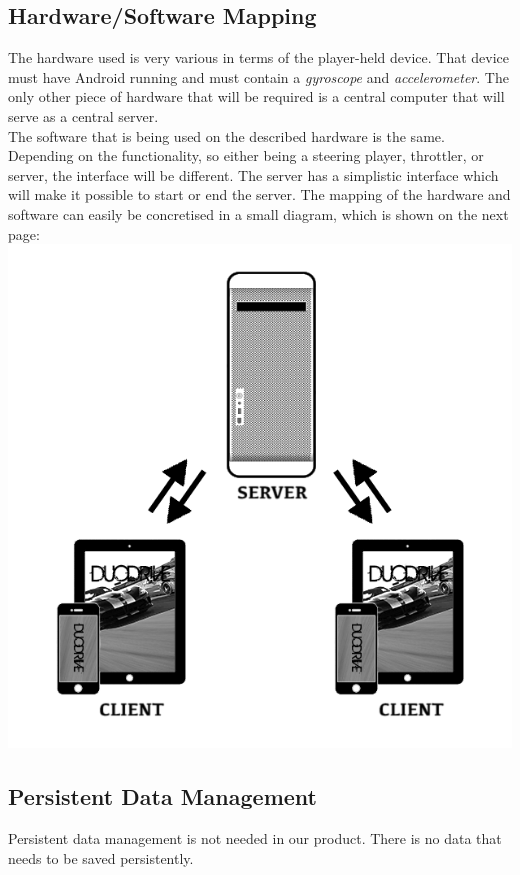 \documentclass[11pt,twoside,a4paper]{article}
\begin{document}
\subsection{Hardware/Software Mapping}
The hardware used is very various in terms of the player-held device. That device must have Android running and must contain a \emph{gyroscope} and \emph{accelerometer}. The only other piece of hardware that will be required is a central computer that will serve as a central server. \\
The software that is being used on the described hardware is the same. Depending on the functionality, so either being a steering player, throttler, or server, the interface will be different. The server has a simplistic interface which will make it possible to start or end the server.
The mapping of the hardware and software can easily be concretised in a small diagram, which is shown on the next page:
\includegraphics[width=\textwidth]{ClientServer.png}


\subsection{Persistent Data Management}
Persistent data management is not needed in our product. There is no data that needs to be saved persistently.
\end{document}
